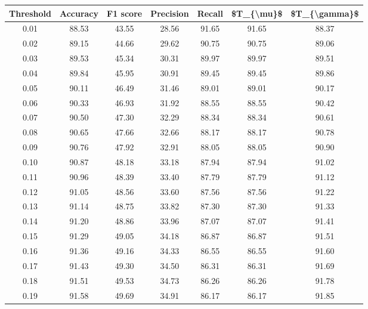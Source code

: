 \begin{tabular}{|c|c|c|c|c|c|c|}
\hline
 Threshold &  Accuracy &  F1 score &  Precision &  Recall &  \$T\_\{\textbackslash mu\}\$ &  \$T\_\{\textbackslash gamma\}\$ \\
\hline
      0.01 &     88.53 &     43.55 &      28.56 &   91.65 &      91.65 &         88.37 \\
      0.02 &     89.15 &     44.66 &      29.62 &   90.75 &      90.75 &         89.06 \\
      0.03 &     89.53 &     45.34 &      30.31 &   89.97 &      89.97 &         89.51 \\
      0.04 &     89.84 &     45.95 &      30.91 &   89.45 &      89.45 &         89.86 \\
      0.05 &     90.11 &     46.49 &      31.46 &   89.01 &      89.01 &         90.17 \\
      0.06 &     90.33 &     46.93 &      31.92 &   88.55 &      88.55 &         90.42 \\
      0.07 &     90.50 &     47.30 &      32.29 &   88.34 &      88.34 &         90.61 \\
      0.08 &     90.65 &     47.66 &      32.66 &   88.17 &      88.17 &         90.78 \\
      0.09 &     90.76 &     47.92 &      32.91 &   88.05 &      88.05 &         90.90 \\
      0.10 &     90.87 &     48.18 &      33.18 &   87.94 &      87.94 &         91.02 \\
      0.11 &     90.96 &     48.39 &      33.40 &   87.79 &      87.79 &         91.12 \\
      0.12 &     91.05 &     48.56 &      33.60 &   87.56 &      87.56 &         91.22 \\
      0.13 &     91.14 &     48.75 &      33.82 &   87.30 &      87.30 &         91.33 \\
      0.14 &     91.20 &     48.86 &      33.96 &   87.07 &      87.07 &         91.41 \\
      0.15 &     91.29 &     49.05 &      34.18 &   86.87 &      86.87 &         91.51 \\
      0.16 &     91.36 &     49.16 &      34.33 &   86.55 &      86.55 &         91.60 \\
      0.17 &     91.43 &     49.30 &      34.50 &   86.31 &      86.31 &         91.69 \\
      0.18 &     91.51 &     49.53 &      34.73 &   86.26 &      86.26 &         91.78 \\
      0.19 &     91.58 &     49.69 &      34.91 &   86.17 &      86.17 &         91.85 \\

\end{tabular}
